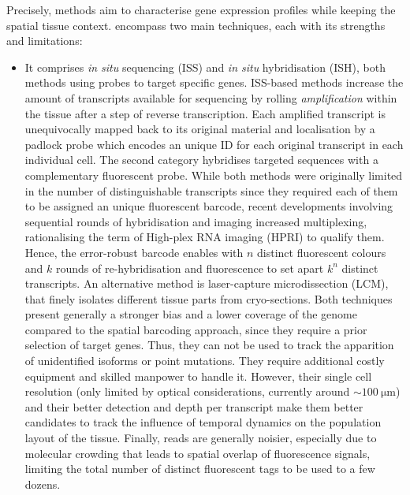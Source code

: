 Precisely,  methods aim to characterise gene expression profiles while keeping the spatial tissue context.  encompass two main techniques, each with its strengths and limitations: 
\begin{itemize}
    \item[Image-based approach] It comprises \textit{in situ} sequencing (ISS) and \textit{in situ} hybridisation (ISH), both methods using probes to target specific genes. ISS-based methods increase the amount of transcripts available for sequencing by rolling \textit{amplification} within the tissue after a step of reverse transcription. Each amplified transcript is unequivocally mapped back to its original material and localisation by a padlock probe which encodes an unique ID for each original transcript in each individual cell. The second category hybridises targeted sequences with a complementary fluorescent probe. While both methods were originally limited in the number of distinguishable transcripts since they required each of them to be assigned an unique fluorescent barcode, recent developments involving sequential rounds of hybridisation and imaging increased multiplexing, rationalising the term of High-plex RNA imaging (HPRI) to qualify them. Hence, the error-robust barcode enables with $n$ distinct fluorescent colours and $k$ rounds of re-hybridisation and fluorescence to set apart $k^n$ distinct transcripts. An alternative method is laser-capture microdissection (LCM), that finely isolates different tissue parts from cryo-sections. 
    Both techniques present generally a stronger bias and a lower coverage of the genome compared to the spatial barcoding approach, since they require a prior selection of target genes. Thus, they can not be used to track the apparition of unidentified isoforms or point mutations. They require additional costly equipment and skilled manpower to handle it. However, their single cell resolution (only limited by optical considerations, currently around $\sim \SI{100}{\micro \metre}$) and their better detection and depth per transcript make them better candidates to track the influence of temporal dynamics on the population layout of the tissue.
    Finally, reads are generally noisier, especially due to molecular crowding that leads to spatial overlap of fluorescence signals, limiting the total number of distinct fluorescent tags to be used to a few dozens.


\end{itemize}
